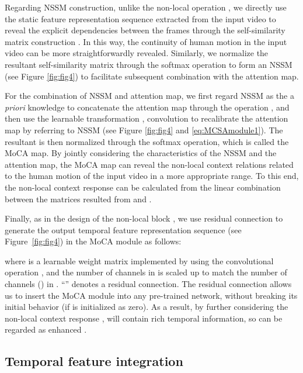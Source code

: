\documentclass[10pt,twocolumn,letterpaper]{article}
\begin{document}
Regarding NSSM construction, unlike the non-local operation \cite{Wang2018NonlocalNN}, we directly use the static feature representation sequence  extracted from the input video to reveal the explicit dependencies between the frames through the self-similarity matrix \cite{10.1145/319463.319472} construction . In this way, the continuity of human motion in the input video can be more straightforwardly revealed. Similarly, we normalize the resultant self-similarity matrix through the softmax operation to form an NSSM (see Figure \ref{fig:fig4}) to facilitate subsequent combination with the attention map.


For the combination of NSSM and attention map, we first regard NSSM as the a \emph{priori} knowledge to concatenate the attention map through the operation , and then use the learnable transformation , \ie  convolution to recalibrate the attention map by referring to NSSM (see Figure \ref{fig:fig4} and \cref{eq:MCSAmodule1}). The resultant  is then normalized through the softmax operation, which is called the MoCA map. By jointly considering the characteristics of the NSSM and the attention map, the MoCA map can reveal the non-local context relations related to the human motion of the input video in a more appropriate range. To this end, the non-local context response  can be calculated from the linear combination between the matrices resulted from  and .



Finally, as in the design of the non-local block \cite{Wang2018NonlocalNN}, we use residual connection \cite{He2016DeepRL} to generate the output temporal feature representation sequence  (see Figure~\ref{fig:fig4}) in the MoCA module as follows:\vspace{-6pt}

where  is a learnable weight matrix implemented by using the convolutional operation \cite{Wang2018NonlocalNN}, and the number of channels in  is scaled up to match the number of channels (\ie ) in . ``'' denotes a residual connection. The residual connection allows us to insert the MoCA module into any pre-trained network, without breaking its initial behavior (\eg if  is initialized as zero). As a result, by further considering the non-local context response ,  will contain rich temporal information, so  can be regarded as enhanced .\vspace{-4pt}

\subsection{Temporal feature integration}\vspace{-5pt}
\end{document}
